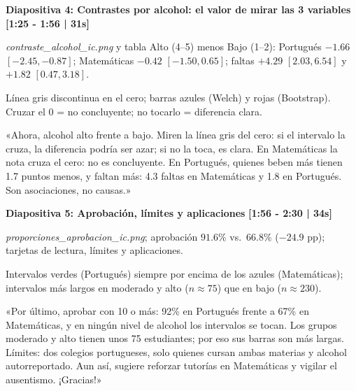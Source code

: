 \documentclass[11pt,a4paper]{article}
\begin{document}
\vspace{0.35cm}

\noindent
\textbf{\large Diapositiva 4: Contrastes por alcohol: el valor de mirar las 3 variables} \hfill \textcolor{timeRed}{\textbf{[1:25 - 1:56 | 31s]}}
\begin{description}[noitemsep,topsep=2pt]
  \item[Visual en Pantalla:] \textit{contraste\_alcohol\_ic.png} y tabla Alto (4--5) menos Bajo (1--2): Portugués $-1.66$ $[-2.45, -0.87]$; Matemáticas $-0.42$ $[-1.50, 0.65]$; faltas $+4.29$ $[2.03, 6.54]$ y $+1.82$ $[0.47, 3.18]$.
  \item[Señalar:] Línea gris discontinua en el cero; barras azules (Welch) y rojas (Bootstrap). Cruzar el 0 = no concluyente; no tocarlo = diferencia clara.
  \item[Guion de Voz (62 palabras):]
    «Ahora, alcohol alto frente a bajo. Miren la línea gris del cero: si el intervalo la cruza, la diferencia podría ser azar; si no la toca, es clara. En Matemáticas la nota cruza el cero: no es concluyente. En Portugués, quienes beben más tienen 1.7 puntos menos, y faltan más: 4.3 faltas en Matemáticas y 1.8 en Portugués. Son asociaciones, no causas.»
\end{description}

\vspace{0.35cm}

\noindent
\textbf{\large Diapositiva 5: Aprobación, límites y aplicaciones} \hfill \textcolor{timeRed}{\textbf{[1:56 - 2:30 | 34s]}}
\begin{description}[noitemsep,topsep=2pt]
  \item[Visual en Pantalla:] \textit{proporciones\_aprobacion\_ic.png}; aprobación $91.6\%$ vs.\ $66.8\%$ ($-24.9$ pp); tarjetas de lectura, límites y aplicaciones.
  \item[Señalar:] Intervalos verdes (Portugués) siempre por encima de los azules (Matemáticas); intervalos más largos en moderado y alto ($n \approx 75$) que en bajo ($n \approx 230$).
  \item[Guion de Voz (65 palabras):]
    «Por último, aprobar con 10 o más: 92\% en Portugués frente a 67\% en Matemáticas, y en ningún nivel de alcohol los intervalos se tocan. Los grupos moderado y alto tienen unos 75 estudiantes; por eso sus barras son más largas. Límites: dos colegios portugueses, solo quienes cursan ambas materias y alcohol autorreportado. Aun así, sugiere reforzar tutorías en Matemáticas y vigilar el ausentismo. ¡Gracias!»
\end{description}
\end{document}
